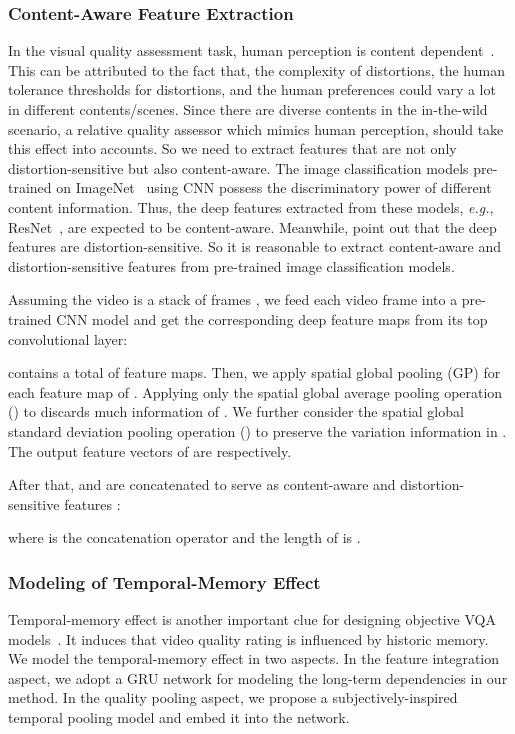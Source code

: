 \documentclass[twocolumn]{svjour3}          \smartqed  \usepackage{graphicx}
\begin{document}
\subsubsection{Content-Aware Feature Extraction}
In the visual quality assessment task, human perception is content dependent~\citep{siahaan2018semantic,triantaphillidou2007image,wang2017videoset,bampis2017study,zhang2018unreasonable,li2019quality,li2019has}. 
This can be attributed to the fact that, the complexity of distortions, the human tolerance thresholds for distortions, and the human preferences could vary a lot in different contents/scenes.
Since there are diverse contents in the in-the-wild scenario, a relative quality assessor which mimics human perception, should take this effect into accounts. 
So we need to extract features that are not only distortion-sensitive but also content-aware.
The image classification models pre-trained on ImageNet~\citep{deng2009imagenet} using CNN possess the discriminatory power of different content information.
Thus, the deep features extracted from these models, \textit{e.g.}, ResNet~\citep{he2016deep}, are expected to be content-aware. 
Meanwhile, \citet{dodge2016understanding} point out that the deep features are distortion-sensitive. 
So it is reasonable to extract content-aware and distortion-sensitive features from pre-trained image classification models.

Assuming the video is a stack of  frames , we feed each video frame into a pre-trained CNN model and get the corresponding deep feature maps  from its top convolutional layer:


 contains a total of  feature maps.
Then, we apply spatial global pooling (GP) for each feature map of . 
Applying only the spatial global average pooling operation () to  discards much information of . 
We further consider the spatial global standard deviation pooling operation () to preserve the variation information in . 
The output feature vectors of  are  respectively.


After that,  and  are concatenated to serve as content-aware and distortion-sensitive features :

where  is the concatenation operator and the length of  is .

\subsubsection{Modeling of Temporal-Memory Effect}
Temporal-memory effect is another important clue for designing objective VQA models~\citep{park2013video,seshadrinathan2011temporal, xu2014no,choi2018video,kim2018deep}. 
It induces that video quality rating is influenced by historic memory.
We model the temporal-memory effect in two aspects. 
In the feature integration aspect, we adopt a GRU network for modeling the long-term dependencies in our method. 
In the quality pooling aspect, we propose a subjectively-inspired temporal pooling model and embed it into the network.
\end{document}
